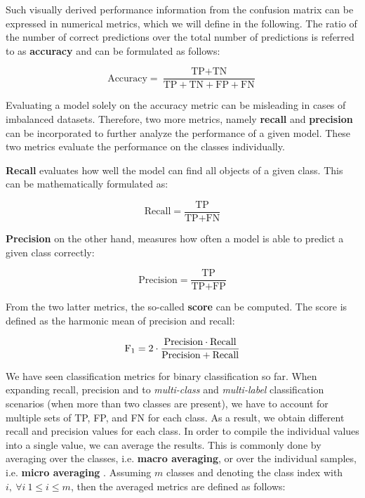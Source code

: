 Such visually derived performance information from the confusion matrix can be
expressed in numerical metrics, which we will define in the following. The
ratio of the number of correct predictions over the total number of
predictions is referred to as \textbf{accuracy} and can be formulated as
follows:

\begin{equation}
    \text{Accuracy} = 
    \frac{\text{TP} + \text{TN}}{\text{TP} + \text{TN} + \text{FP} + \text{FN}}
\end{equation}

Evaluating a model solely on the accuracy metric can be misleading in cases of
imbalanced datasets. Therefore, two more metrics, namely \textbf{recall} and
\textbf{precision} can be incorporated to further analyze the performance of a
given model. These two metrics evaluate the performance on the classes
individually.

\textbf{Recall} evaluates how well the model can find all objects of a given
class. This can be mathematically formulated as:

\begin{equation}
    \text{Recall} = \frac{\text{TP}}{\text{TP} + \text{FN}}
\end{equation}

\textbf{Precision} on the other hand, measures how often a model is able to
predict a given class correctly:

\begin{equation}
    \text{Precision} = \frac{\text{TP}}{\text{TP} + \text{FP}}
\end{equation}

From the two latter metrics, the so-called \textbf{\ff{} score} can be computed.
The \ff{} score is defined as the harmonic mean of precision and recall:

\begin{equation} \label{eq:f1}
    \text{F\textsubscript{1}} = 2 \cdot 
    \frac{\text{Precision} \cdot \text{Recall}}{\text{Precision} + \text{Recall}}
\end{equation}

We have seen classification metrics for binary classification so far. When
expanding recall, precision and \ff{} to \textit{multi-class} and
\textit{multi-label} classification scenarios (when more than two classes are
present), we have to account for multiple sets of TP, FP, and FN for each class.
As a result, we obtain different recall and precision values for each class. In
order to compile the individual values into a single value, we can average the
results. This is commonly done by averaging over the classes, i.e. \textbf{macro
averaging}, or over the individual samples, i.e. \textbf{micro averaging}
\cite{takahashi2022confidence}. Assuming $m$ classes and denoting the class
index with $i ,\ \forall i \ 1 \leq i \leq m$, then the averaged metrics are
defined as follows:

